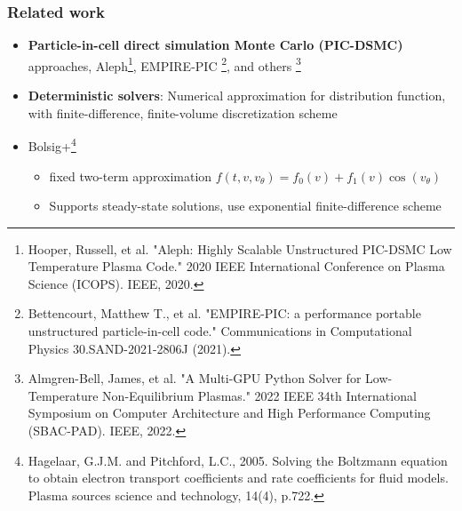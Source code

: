 \documentclass[mathserif, aspectratio=169]{beamer}
\newcommand{\vtheta}{{v_{\theta}}}
\begin{document}
\begin{frame}
	\frametitle{Related work}
	\begin{itemize}
		\item \textbf{Particle-in-cell direct simulation Monte Carlo (PIC-DSMC)} approaches, Aleph\footnote[frame]{\tiny Hooper, Russell, et al. "Aleph: Highly Scalable Unstructured PIC-DSMC Low Temperature Plasma Code." 2020 IEEE International Conference on Plasma Science (ICOPS). IEEE, 2020.}, EMPIRE-PIC \footnote[frame]{\tiny Bettencourt, Matthew T., et al. "EMPIRE-PIC: a performance portable unstructured particle-in-cell code." Communications in Computational Physics 30.SAND-2021-2806J (2021).}, and others \footnote[frame]{ \tiny Almgren-Bell, James, et al. "A Multi-GPU Python Solver for Low-Temperature Non-Equilibrium Plasmas." 2022 IEEE 34th International Symposium on Computer Architecture and High Performance Computing (SBAC-PAD). IEEE, 2022.}
		\item \textbf{Deterministic solvers}: Numerical approximation for distribution function, with finite-difference, finite-volume discretization scheme
		\item Bolsig+\footnote[frame]{\tiny Hagelaar, G.J.M. and Pitchford, L.C., 2005. Solving the Boltzmann equation to obtain electron transport coefficients and rate coefficients for fluid models. Plasma sources science and technology, 14(4), p.722.}
		\begin{itemize}
			\item fixed two-term approximation $f(t, v, \vtheta) = f_0(v) + f_1(v) \cos(\vtheta)$
			\item Supports steady-state solutions, use exponential finite-difference scheme
		\end{itemize}
	\end{itemize}
\end{frame}
\end{document}
